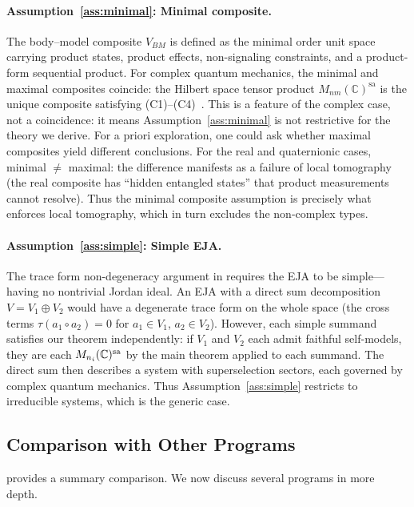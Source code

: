 \paragraph{Assumption~\ref{ass:minimal}: Minimal composite.}
The body--model composite $V_{BM}$ is defined as the minimal order
unit space carrying product states, product effects, non-signaling
constraints, and a product-form sequential product.  For complex
quantum mechanics, the minimal and maximal composites coincide: the
Hilbert space tensor product $M_{nm}(\mathbb{C})^{\mathrm{sa}}$ is
the unique composite satisfying
(C1)--(C4)~\cite{Barnum2023}.  This is a
feature of the complex case, not a coincidence: it means Assumption~\ref{ass:minimal}
is not restrictive for the theory we derive.
For a priori exploration, one could ask whether maximal composites
yield different conclusions.  For the real and quaternionic cases,
minimal $\neq$ maximal: the difference manifests as a failure of local
tomography (the real composite has ``hidden entangled states'' that
product measurements cannot resolve).  Thus the minimal composite
assumption is precisely what enforces local tomography, which in turn
excludes the non-complex types.

\paragraph{Assumption~\ref{ass:simple}: Simple EJA.}
The trace form non-degeneracy argument in
 requires the EJA to be
simple---having no nontrivial Jordan ideal.  An EJA with a direct sum
decomposition $V = V_{1} \oplus V_{2}$ would have a degenerate trace
form on the whole space (the cross terms $\tau(a_{1} \circ a_{2}) = 0$
for $a_{1} \in V_{1}$, $a_{2} \in V_{2}$).  However, each simple
summand satisfies our theorem independently: if $V_{1}$ and $V_{2}$
each admit faithful self-models, they are each $M_{n_{i}}(\mathbb{C})^{\mathrm{sa}}$ by the
main theorem applied to each summand.  The direct sum then describes a
system with superselection sectors, each governed by complex quantum
mechanics.  Thus Assumption~\ref{ass:simple} restricts to irreducible
systems, which is the generic case.


\subsection{Comparison with Other Programs}\label{subsec:comparison}

 provides a summary comparison.  We now discuss
several programs in more depth.

